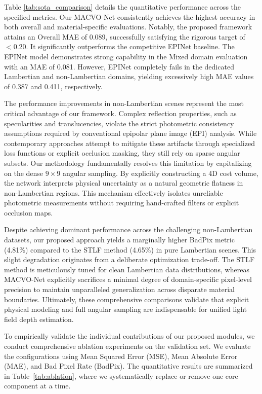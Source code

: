 \documentclass[lettersize,journal]{IEEEtran}
\begin{document}
Table \ref{tab:sota_comparison} details the quantitative performance across the specified metrics. Our MACVO-Net consistently achieves the highest accuracy in both overall and material-specific evaluations. Notably, the proposed framework attains an Overall MAE of 0.089, successfully satisfying the rigorous target of $< 0.20$. It significantly outperforms the competitive EPINet \cite{heber2018} baseline. The EPINet model demonstrates strong capability in the Mixed domain evaluation with an MAE of 0.081. However, EPINet completely fails in the dedicated Lambertian and non-Lambertian domains, yielding excessively high MAE values of 0.387 and 0.411, respectively.

The performance improvements in non-Lambertian scenes represent the most critical advantage of our framework. Complex reflection properties, such as specularities and translucencies, violate the strict photometric consistency assumptions required by conventional epipolar plane image (EPI) analysis. While contemporary approaches \cite{li2021, zhang2023} attempt to mitigate these artifacts through specialized loss functions or explicit occlusion masking, they still rely on sparse angular subsets. Our methodology fundamentally resolves this limitation by capitalizing on the dense $9 \times 9$ angular sampling. By explicitly constructing a 4D cost volume, the network interprets physical uncertainty as a natural geometric flatness in non-Lambertian regions. This mechanism effectively isolates unreliable photometric measurements without requiring hand-crafted filters or explicit occlusion maps.

Despite achieving dominant performance across the challenging non-Lambertian datasets, our proposed approach yields a marginally higher BadPix metric (4.81\%) compared to the STLF method \cite{zhang2023} (4.65\%) in pure Lambertian scenes. This slight degradation originates from a deliberate optimization trade-off. The STLF method is meticulously tuned for clean Lambertian data distributions, whereas MACVO-Net explicitly sacrifices a minimal degree of domain-specific pixel-level precision to maintain unparalleled generalization across disparate material boundaries. Ultimately, these comprehensive comparisons validate that explicit physical modeling and full angular sampling are indispensable for unified light field depth estimation.

To empirically validate the individual contributions of our proposed modules, we conduct comprehensive ablation experiments on the validation set. We evaluate the configurations using Mean Squared Error (MSE), Mean Absolute Error (MAE), and Bad Pixel Rate (BadPix). The quantitative results are summarized in Table~\ref{tab:ablation}, where we systematically replace or remove one core component at a time.
\end{document}
